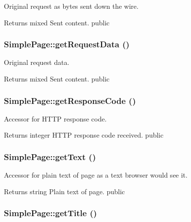 \label{class_simple_page_a49e5532c77f862e152c7783d513b61f7}
Original request as bytes sent down the wire. \begin{DoxyReturn}{Returns}
mixed Sent content.  public 
\end{DoxyReturn}
\hypertarget{class_simple_page_a3a6898f9e3df0e25b1d6595fa047138b}{
\subsubsection[{getRequestData}]{\setlength{\rightskip}{0pt plus 5cm}SimplePage::getRequestData ()}}
\label{class_simple_page_a3a6898f9e3df0e25b1d6595fa047138b}
Original request data. \begin{DoxyReturn}{Returns}
mixed Sent content.  public 
\end{DoxyReturn}
\hypertarget{class_simple_page_a760bb3def2b63c94a828c00539db1268}{
\subsubsection[{getResponseCode}]{\setlength{\rightskip}{0pt plus 5cm}SimplePage::getResponseCode ()}}
\label{class_simple_page_a760bb3def2b63c94a828c00539db1268}
Accessor for HTTP response code. \begin{DoxyReturn}{Returns}
integer HTTP response code received.  public 
\end{DoxyReturn}
\hypertarget{class_simple_page_aaf1c11cefece76fd17c7070649fc569b}{
\subsubsection[{getText}]{\setlength{\rightskip}{0pt plus 5cm}SimplePage::getText ()}}
\label{class_simple_page_aaf1c11cefece76fd17c7070649fc569b}
Accessor for plain text of page as a text browser would see it. \begin{DoxyReturn}{Returns}
string Plain text of page.  public 
\end{DoxyReturn}
\hypertarget{class_simple_page_a8cee582bd07bdc14ba5f9246e6600f2c}{
\subsubsection[{getTitle}]{\setlength{\rightskip}{0pt plus 5cm}SimplePage::getTitle ()}}
